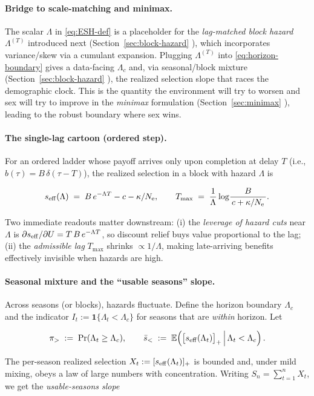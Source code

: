 \documentclass[11pt]{article}
\theoremstyle{upright}
\newcommand{\Ne}{N_{\mathrm{e}}}
\newcommand{\seff}[1][]{s_{\mathrm{eff}\if\relax\detokenize{#1}\relax\else,#1\fi}}
\newcommand{\hazT}[1]{\Lambda^{(#1)}}          %
\begin{document}
\paragraph{Bridge to scale-matching and minimax.}
The scalar $\Lambda$ in \eqref{eq:ESH-def} is a placeholder for the \emph{lag-matched block hazard} $\hazT{T}$ introduced next (Section~\ref{sec:block-hazard} ), which incorporates variance/skew via a cumulant expansion. Plugging $\hazT{T}$ into \eqref{eq:horizon-boundary} gives a data-facing $\Lambda_c$ and, via seasonal/block mixture (Section~\ref{sec:block-hazard} ), the realized selection slope that races the demographic clock. This is the quantity the environment will try to worsen and sex will try to improve in the \emph{minimax}  formulation (Section~\ref{sec:minimax} ), leading to the robust boundary where sex wins.

\paragraph{The single-lag cartoon (ordered step).}
For an ordered ladder whose payoff arrives only upon completion at delay $T$ (i.e., $b(\tau)=B\,\delta(\tau-T)$), the realized selection in a block with hazard $\Lambda$ is

$$
\seff(\Lambda)\;=\;B\,e^{-\Lambda T}-c-\kappa/\Ne,
\qquad
T_{\max}\;=\;\frac{1}{\Lambda}\log\!\frac{B}{\,c+\kappa/\Ne\,}.
$$

Two immediate readouts matter downstream: (i) the \emph{leverage of hazard cuts}  near $\Lambda$ is $\partial \seff/\partial U = T\,B\,e^{-\Lambda T}$, so discount relief buys value proportional to the lag; (ii) the \emph{admissible lag} $T_{\max}$ shrinks $\propto 1/\Lambda$, making late-arriving benefits effectively invisible when hazards are high.

\paragraph{Seasonal mixture and the “usable seasons” slope.} %
Across seasons (or blocks), hazards fluctuate. Define the horizon boundary $\Lambda_c$ and the indicator $I_t:=\mathbf 1\{\Lambda_t<\Lambda_c\}$ for seasons that are \emph{within} horizon. Let

$$
\pi_{>} \;:=\; \Pr(\Lambda_t\ge \Lambda_c),\qquad
\bar s_{<} \;:=\; \mathbb E\!\left(\big[\seff(\Lambda_t)\big]_+ \,\middle|\, \Lambda_t<\Lambda_c\right).
$$

The per-season realized selection $X_t := [\seff(\Lambda_t)]_+$ is bounded and, under mild mixing, obeys a law of large numbers with concentration. Writing $S_n=\sum_{t=1}^n X_t$, we get the \emph{usable-seasons slope}
\end{document}
